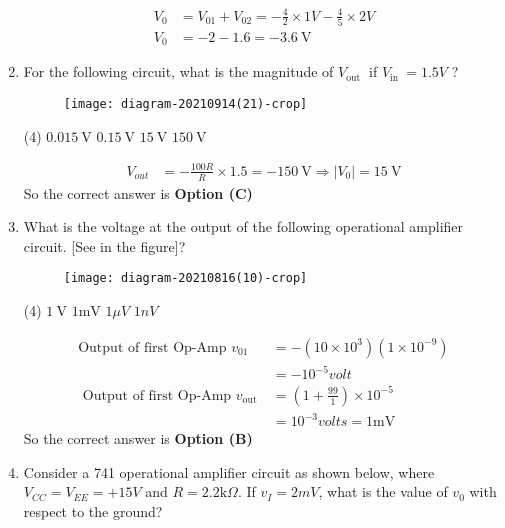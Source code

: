 \begin{enumerate}
\begin{answer}
\begin{align*}
V_{0}&=V_{01}+V_{02}=-\frac{4}{2} \times 1 V-\frac{4}{5} \times 2 V\\
V_{0}&=-2-1.6=-3.6 \mathrm{~V}
\end{align*}
\end{answer}
	\item For the following circuit, what is the magnitude of $V_{\text {out }}$ if $V_{\text {in }}=1.5 V$ ?
{	}
\begin{figure}[H]
\centering
\texttt{[image: diagram-20210914(21)-crop]}
\end{figure}
\begin{tasks}(4)
\task[\textbf{A.}] $0.015 \mathrm{~V}$
\task[\textbf{B.}] $0.15 \mathrm{~V}$
\task[\textbf{C.}] $15 \mathrm{~V}$
\task[\textbf{D.}] $150 \mathrm{~V}$
\end{tasks}
\begin{answer}
\begin{align*}
V_{o u t}&=-\frac{100 R}{R} \times 1.5=-150 \mathrm{~V} \Rightarrow\left|V_{0}\right|=15 \mathrm{~V}
\end{align*}
So the correct answer is \textbf{Option (C)}
\end{answer}
	\item What is the voltage at the output of the following operational amplifier circuit. [See in the figure]?
{	}
\begin{figure}[H]
\centering
\texttt{[image: diagram-20210816(10)-crop]}
\end{figure}
\begin{tasks}(4)
\task[\textbf{A.}] $1 \mathrm{~V}$
\task[\textbf{B.}] $1 \mathrm{mV}$
\task[\textbf{C.}] $1 \mu V$
\task[\textbf{D.}] $1 n V$
\end{tasks}
\begin{answer}
\begin{align*}
\text{Output of first Op-Amp }v_{01}&=-\left(10 \times 10^{3}\right)\left(1 \times 10^{-9}\right)\\&=-10^{-5} volt\\
\text{	Output of first Op-Amp }v_{\text {out }}&=\left(1+\frac{99}{1}\right) \times 10^{-5}\\&=10^{-3} volts =1 \mathrm{mV}
\end{align*}
So the correct answer is \textbf{Option (B)}
\end{answer}
	\item Consider a 741 operational amplifier circuit as shown below, where $V_{C C}=V_{E E}=+15 V$ and $R=2.2 \mathrm{k} \Omega$. If $v_{I}=2 m V$, what is the value of $v_{0}$ with respect to the ground?

\end{enumerate}

